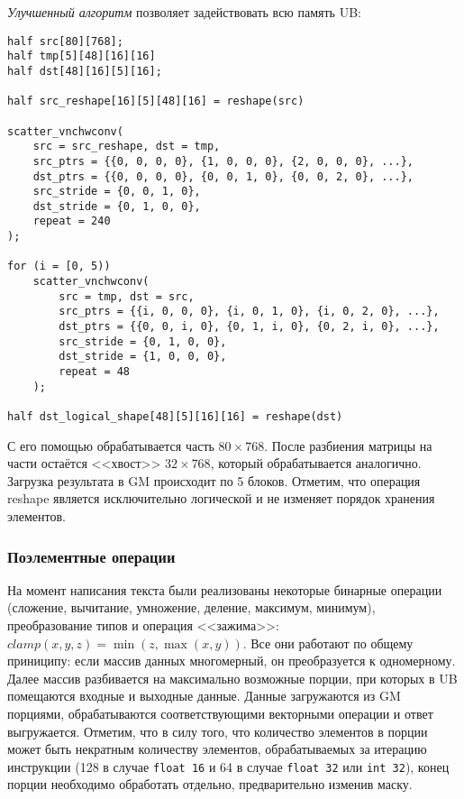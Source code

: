 \textit{Улучшенный алгоритм} позволяет задействовать всю память UB:

\begin{lstlisting}
half src[80][768];
half tmp[5][48][16][16]
half dst[48][16][5][16];

half src_reshape[16][5][48][16] = reshape(src)

scatter_vnchwconv(
    src = src_reshape, dst = tmp,
    src_ptrs = {{0, 0, 0, 0}, {1, 0, 0, 0}, {2, 0, 0, 0}, ...},
    dst_ptrs = {{0, 0, 0, 0}, {0, 0, 1, 0}, {0, 0, 2, 0}, ...},
    src_stride = {0, 0, 1, 0},
    dst_stride = {0, 1, 0, 0},
    repeat = 240
);

for (i = [0, 5))
    scatter_vnchwconv(
        src = tmp, dst = src,
        src_ptrs = {{i, 0, 0, 0}, {i, 0, 1, 0}, {i, 0, 2, 0}, ...},
        dst_ptrs = {{0, 0, i, 0}, {0, 1, i, 0}, {0, 2, i, 0}, ...},
        src_stride = {0, 1, 0, 0},
        dst_stride = {1, 0, 0, 0},
        repeat = 48
    );

half dst_logical_shape[48][5][16][16] = reshape(dst)
\end{lstlisting}

С его помощью обрабатывается часть $80 \times 768$. После разбиения матрицы
на части остаётся <<хвост>> $32 \times 768$, который обрабатывается аналогично.
Загрузка результата в GM происходит по 5 блоков. Отметим, что операция reshape
является исключительно логической и не изменяет порядок хранения элементов.

\subsubsection{Поэлементные операции}

На момент написания текста были реализованы некоторые бинарные операции
(сложение, вычитание, умножение, деление, максимум, минимум), преобразование
типов и операция <<зажима>>: $clamp(x, y, z) = \min(z, \max(x, y))$. Все они
работают по общему приниципу: если массив данных многомерный, он преобразуется
к одномерному. Далее массив разбивается на максимально возможные порции,
при которых в UB помещаются входные и выходные данные. Данные загружаются из
GM порциями, обрабатываются соответствующими векторными операции и ответ
выгружается. Отметим, что в силу того, что количество элементов в порции
может быть некратным количеству элементов, обрабатываемых за итерацию инструкции
(128 в случае \texttt{float 16} и 64 в случае \texttt{float 32} или
\texttt{int 32}), конец порции необходимо обработать отдельно, предварительно
изменив маску.

